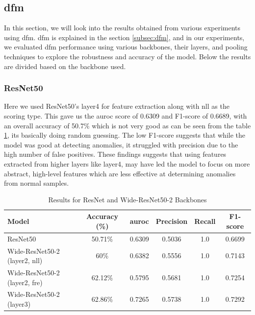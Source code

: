 
\subsection*{\gls{dfm}}

In this section, we will look into the results obtained from various experiments using \gls{dfm}. \gls{dfm} is explained in the section \ref{subsec:dfm}, and in our experiments, we evaluated \gls{dfm} performance using various backbones, their layers, and pooling techniques to explore the robustness and accuracy of the model. Below the results are divided based on the backbone used. 

\subsubsection*{ResNet50}

Here we used ResNet50's layer4 for feature extraction along with \gls{nll} as the scoring type. This gave us the \gls{auroc} score of 0.6309 and F1-score of 0.6689, with an overall accuracy of 50.7\% which is not very good as can be seen from the table \ref{tab:dfm resnet results}, its basically doing random guessing. The low F1-score suggests that while the model was good at detecting anomalies, it struggled with precision due to the high number of false positives. These findings suggests that using features extracted from higher layers like layer4, may have led the model to focus on more abstract, high-level features which are less effective at determining anomalies from normal samples.

\begin{table}[ht!]
    \centering
    \begin{tabular}{|l|c|c|c|c|c|}
        \hline
        \textbf{Model} & \textbf{Accuracy (\%)} & \textbf{\gls{auroc}} &\textbf{Precision} & \textbf{Recall} & \textbf{F1-score} \\ \hline
        ResNet50 & 50.71\% & 0.6309 & 0.5036 & 1.0 & 0.6699 \\ \hline
        Wide-ResNet50-2 (layer2, nll) & 60\% & 0.6382 & 0.5556 & 1.0 & 0.7143 \\ \hline
        Wide-ResNet50-2 (layer2, fre) & 62.12\% & 0.5795 & 0.5681 & 1.0 & 0.7254 \\ \hline
        Wide-ResNet50-2 (layer3) & 62.86\% & 0.7265 & 0.5738 & 1.0 & 0.7292 \\ \hline
    \end{tabular}
    \caption{Results for ResNet and Wide-ResNet50-2 Backbones}
    \label{tab:dfm resnet results}
\end{table}

